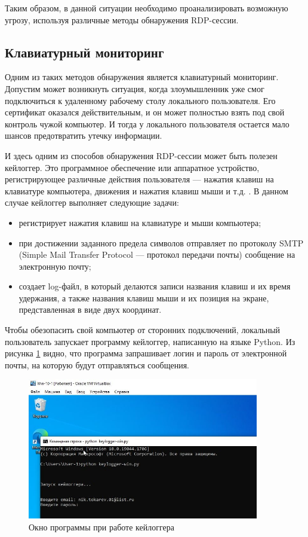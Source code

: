 \documentclass[bachelor, och, coursework]{SCWorks}
\begin{document}
  Таким образом, в данной ситуации необходимо проанализировать возможную угрозу, используя различные методы обнаружения RDP-сессии.
  
  \subsection{Клавиатурный мониторинг}

  Одним из таких методов обнаружения является клавиатурный мониторинг. Допустим может возникнуть ситуация, когда злоумышленник уже смог подключиться к
  удаленному рабочему столу локального пользователя. Его сертификат оказался действительным, и он может полностью взять под свой контроль чужой компьютер.
  И тогда у локального пользователя остается мало шансов предотвратить утечку информации.
  
  И здесь одним из способов обнаружения RDP-сессии может быть полезен кейлоггер. Это программное обеспечение или аппаратное устройство, регистрирующее
  различные действия пользователя — нажатия клавиш на клавиатуре компьютера, движения и нажатия клавиш мыши и т.д. \cite{keylog}. В данном случае кейлоггер
  выполняет следующие задачи:
  
  \begin{itemize}
    \item регистрирует нажатия клавиш на клавиатуре и мыши компьютера;
    \item при достижении заданного предела символов отправляет по протоколу SMTP (Simple Mail Transfer Protocol --- протокол передачи почты) сообщение на
    электронную почту;
    \item создает log-файл, в который делаются записи названия клавиш и их время удержания, а также названия клавиш мыши и их позиция на экране, представленная
    в виде двух координат.  
  \end{itemize}

  Чтобы обезопасить свой компьютер от сторонних подключений, локальный пользователь запускает программу кейлоггер, написанную на языке Python. Из рисунка \ref{cmd}
  видно, что программа запрашивает логин и пароль от электронной почты, на которую будут отправляться сообщения.
  
  \begin{figure}[H]
    \centering
    \includegraphics[width=0.9\textwidth]{photo/cmd.png}
    \caption{Окно программы при работе кейлоггера}
    \label{cmd}
  \end{figure}
\end{document}
